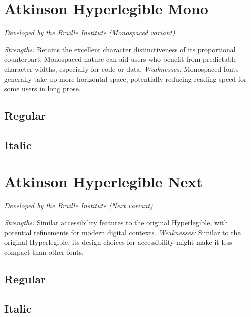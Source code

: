 \begin{raggedright}
\pagebreak
\section{Atkinson Hyperlegible Mono}\label{troubleAtkinsonMono}
\emph{Developed by \href{https://brailleinstitute.org/freefont}{the Braille Institute} (Monospaced variant)}
\begin{raggedright}
\emph{Strengths:} Retains the excellent character distinctiveness of its proportional counterpart. Monospaced nature can aid users who benefit from predictable character widths, especially for code or data.
\emph{Weaknesses:} Monospaced fonts generally take up more horizontal space, potentially reducing reading speed for some users in long prose.

\subsection{Regular}
\FontSample{\atkinsonmonofont}

\subsection{Italic}
\FontSample{{\atkinsonmonofont\itshape}}
\end{raggedright}


\pagebreak
\section{Atkinson Hyperlegible Next}\label{troubleAtkinsonNext}
\emph{Developed by \href{https://brailleinstitute.org/freefont}{the Braille Institute} (Next variant)}
\begin{raggedright}
\emph{Strengths:} Similar accessibility features to the original Hyperlegible, with potential refinements for modern digital contexts.
\emph{Weaknesses:} Similar to the original Hyperlegible, its design choices for accessibility might make it less compact than other fonts.

\subsection{Regular}
\FontSample{\atkinsonnextfont}

\subsection{Italic}
\FontSample{{\atkinsonnextfont\itshape}}
\end{raggedright}



\end{raggedright}
